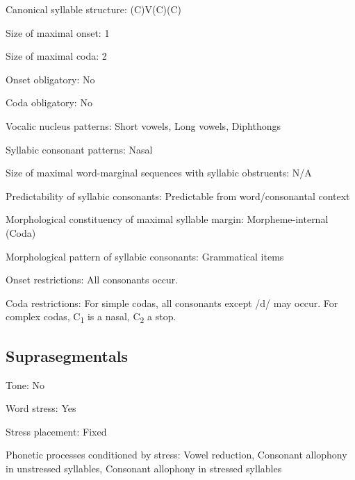 {\begin{appendixdesc}
\item[Canonical syllable structure:] (C)V(C)(C) \citep[6--9]{Sapir1965}

\item[Size of maximal onset:] 1

\item[Size of maximal coda:] 2

\item[Onset obligatory:] No

\item[Coda obligatory:] No

\item[Vocalic nucleus patterns:] Short vowels, Long vowels, Diphthongs

\item[Syllabic consonant patterns:] Nasal

\item[Size of maximal word-marginal sequences with syllabic obstruents:] N/A

\item[Predictability of syllabic consonants:] Predictable from word/consonantal context

\item[Morphological constituency of maximal syllable margin:] Morpheme-internal (Coda)

\item[Morphological pattern of syllabic consonants:] Grammatical items

\item[Onset restrictions:] All consonants occur.

\item[Coda restrictions:] For simple codas, all consonants except /d/ may occur. For complex codas, C\textsubscript{1} is a nasal, C\textsubscript{2} a stop.
\end{appendixdesc}
\subsection*{Suprasegmentals}
\begin{appendixdesc}
\item[Tone:] No

\item[Word stress:] Yes

\item[Stress placement:] Fixed

\item[Phonetic processes conditioned by stress:] Vowel reduction, Consonant allophony in unstressed syllables, Consonant allophony in stressed syllables


\end{appendixdesc}}
